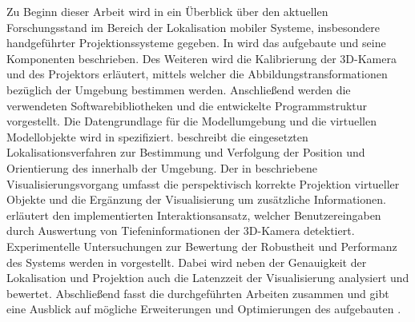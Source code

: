 Zu Beginn dieser Arbeit wird in  ein Überblick über den aktuellen Forschungsstand im Bereich der Lokalisation mobiler Systeme, insbesondere handgeführter Projektionssysteme gegeben. In  wird das aufgebaute \kps{} und seine Komponenten beschrieben. Des Weiteren wird die Kalibrierung der 3D-Kamera und des Projektors erläutert, mittels welcher die Abbildungstransformationen bezüglich der Umgebung bestimmen werden. Anschließend werden die verwendeten Softwarebibliotheken und die entwickelte Programmstruktur vorgestellt. Die Datengrundlage für die Modellumgebung und die virtuellen Modellobjekte wird in  spezifiziert.  beschreibt die eingesetzten Lokalisationsverfahren zur Bestimmung und Verfolgung der Position und Orientierung des  innerhalb der Umgebung. Der in  beschriebene Visualisierungsvorgang umfasst die perspektivisch korrekte Projektion virtueller Objekte und die Ergänzung der Visualisierung um zusätzliche Informationen.  erläutert den implementierten Interaktionsansatz, welcher Benutzereingaben durch Auswertung von Tiefeninformationen der 3D-Kamera detektiert. Experimentelle Untersuchungen zur Bewertung der Robustheit und Performanz des Systems werden in  vorgestellt. Dabei wird neben der Genauigkeit der Lokalisation und Projektion auch die Latenzzeit der Visualisierung analysiert und bewertet. Abschließend fasst  die durchgeführten Arbeiten zusammen und gibt eine Ausblick auf mögliche Erweiterungen und Optimierungen des aufgebauten .


